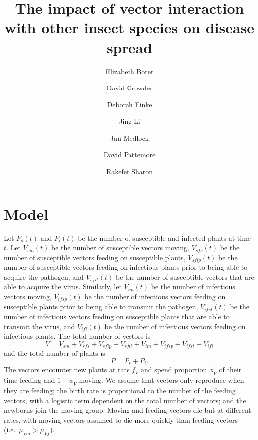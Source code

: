 \documentclass{article}
\title{The impact of vector interaction with other insect species on
  disease spread}
\author{
  Elizabeth Borer
  \and
  David Crowder
  \and
  Deborah Finke
  \and
  Jing Li
  \and
  Jan Medlock
  \and
  David Pattemore
  \and
  Rakefet Sharon
}
\begin{document}
\maketitle

\section{Model}

Let $P_s(t)$ and $P_i(t)$ be the number of susceptible and infected
plants at time $t$.  Let $V_{sm}(t)$ be the number of susceptible
vectors moving, $V_{sfs}(t)$ be the number of susceptible vectors
feeding on susceptible plants, $V_{sfip}(t)$ be the number of
susceptible vectors feeding on infectious plants prior to being able
to acquire the pathogen, and $V_{sfit}(t)$ be the number of
susceptible vectors that are able to acquire the virus.  Similarly,
let $V_{im}(t)$ be the number of infectious vectors moving,
$V_{ifsp}(t)$ be the number of infectious vectors feeding on
susceptible plants prior to being able to transmit the pathogen,
$V_{ifst}(t)$ be the number of infectious vectors feeding on
susceptible plants that are able to transmit the virus, and
$V_{ifi}(t)$ be the number of infectious vectors feeding on infectious
plants.  The total number of vectors is
\begin{equation}
  V = V_{sm} + V_{sfs} + V_{sfip} + V_{sfit} + V_{im} + V_{ifsp} +
  V_{ifst} + V_{ifi}
\end{equation}
and the total number of plants is
\begin{equation}
  P = P_s + P_i.
\end{equation}
The vectors encounter new plants at rate $f_V$ and spend proportion
$\phi_V$ of their time feeding and $1 - \phi_V$ moving.  We assume
that vectors only reproduce when they are feeding; the birth rate is
proportional to the number of the feeding vectors, with a logistic
term dependent on the total number of vectors; and the newborns join
the moving group.  Moving and feeding vectors die but at different
rates, with moving vectors assumed to die more quickly than feeding
vectors (i.e.~$\mu_{Vm} > \mu_{Vf}$).
\end{document}
